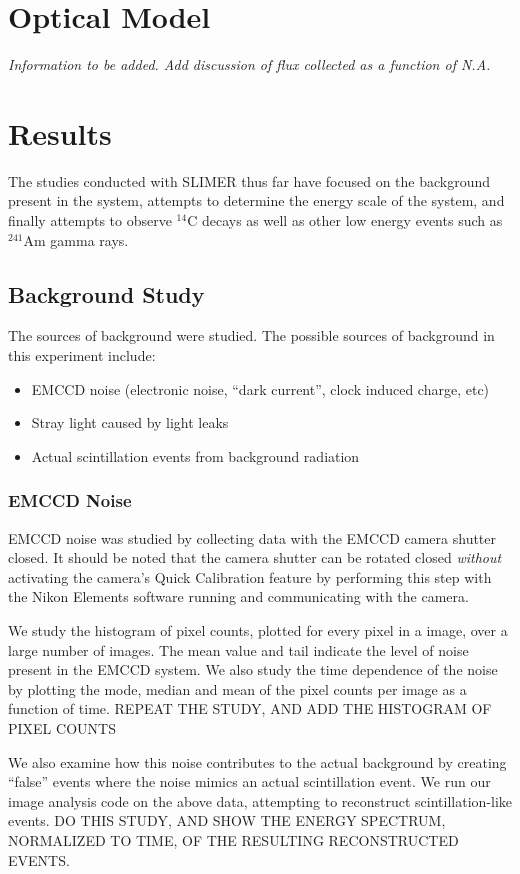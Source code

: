 \documentclass[11pt]{article}
\newcommand{\nuc}[2]{\ensuremath{^{#1}}#2}
\begin{document}
\section{Optical Model}
\emph{Information to be added. Add discussion of flux collected as a function of N.A.}


\section{Results}
The studies conducted with SLIMER thus far have focused on the background present in the system, attempts to determine the energy scale of the system, and finally attempts to observe \nuc{14}{C} decays as well as other low energy events such as \nuc{241}{Am} gamma rays. 

\subsection{Background Study}
The sources of background were studied. The possible sources of background in this experiment include:
\begin{itemize}
\item EMCCD noise (electronic noise, ``dark current'',  clock induced charge, etc)
\item Stray light caused by light leaks  
\item Actual scintillation events from background radiation
\end{itemize}
\subsubsection{EMCCD Noise}
EMCCD noise was studied by collecting data with the EMCCD camera shutter closed. It should be noted that the camera shutter can be rotated closed 	\emph{without} activating the camera's Quick Calibration feature by performing this step with the Nikon Elements software running and communicating with the camera.

We study the histogram of pixel counts, plotted for every pixel in a image, over a large number of images.
The mean value and tail indicate the level of noise present in the EMCCD system. We also study the time dependence of the noise by plotting the mode, median and mean of the pixel counts per image
as a function of time. REPEAT THE STUDY, AND ADD THE HISTOGRAM OF PIXEL COUNTS

We also examine how this noise contributes to the actual background by creating ``false'' events where the noise mimics an actual scintillation event. We run our image analysis code on the above data, attempting to reconstruct scintillation-like events. DO THIS STUDY, AND SHOW THE ENERGY SPECTRUM, NORMALIZED TO TIME, OF THE RESULTING RECONSTRUCTED EVENTS.
\end{document}
